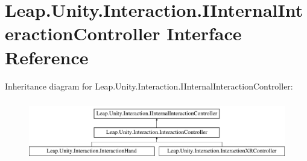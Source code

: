 \hypertarget{interface_leap_1_1_unity_1_1_interaction_1_1_i_internal_interaction_controller}{}\section{Leap.\+Unity.\+Interaction.\+I\+Internal\+Interaction\+Controller Interface Reference}
\label{interface_leap_1_1_unity_1_1_interaction_1_1_i_internal_interaction_controller}
Inheritance diagram for Leap.\+Unity.\+Interaction.\+I\+Internal\+Interaction\+Controller\+:\begin{figure}[H]
\begin{center}
\leavevmode
\includegraphics[height=2.736156cm]{interface_leap_1_1_unity_1_1_interaction_1_1_i_internal_interaction_controller}
\end{center}
\end{figure}
